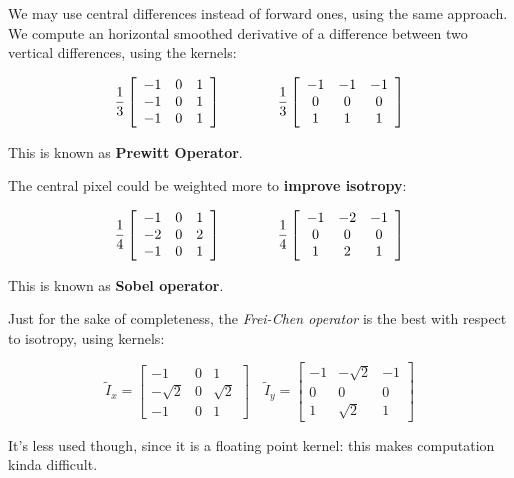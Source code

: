 \documentclass{article}
\begin{document}
We may use central differences instead of forward ones, using the same
approach. We compute an horizontal smoothed derivative of a difference
between two vertical differences, using the kernels:

\[
\frac{1}{3}\left[\begin{array}{lll}
-1 & 0 & 1 \\
-1 & 0 & 1 \\
-1 & 0 & 1
\end{array}\right] \hspace{40px}\frac{1}{3}\left[\begin{array}{ccc}
-1 & -1 & -1 \\
0 & 0 & 0 \\
1 & 1 & 1
\end{array}\right]
\]

This is known as \textbf{Prewitt Operator}.

The central pixel could be weighted more to \textbf{improve isotropy}:

\[
\frac{1}{4}\left[\begin{array}{lll}
-1 & 0 & 1 \\
-2 & 0 & 2 \\
-1 & 0 & 1
\end{array}\right] \hspace{40px}\frac{1}{4}\left[\begin{array}{ccc}
-1 & -2 & -1 \\
0 & 0 & 0 \\
1 & 2 & 1
\end{array}\right]
\]

This is known as \textbf{Sobel operator}.

Just for the sake of completeness, the \emph{Frei-Chen operator} is the
best with respect to isotropy, using kernels:

\[
\tilde{I}_{x}=\left[\begin{array}{ccc}
-1 & 0 & 1 \\
-\sqrt{2} & 0 & \sqrt{2} \\
-1 & 0 & 1
\end{array}\right] \quad \tilde{I}_{y}=\left[\begin{array}{ccc}
-1 & -\sqrt{2} & -1 \\
0 & 0 & 0 \\
1 & \sqrt{2} & 1
\end{array}\right]
\]

It's less used though, since it is a floating point kernel: this makes
computation kinda difficult.
\end{document}
